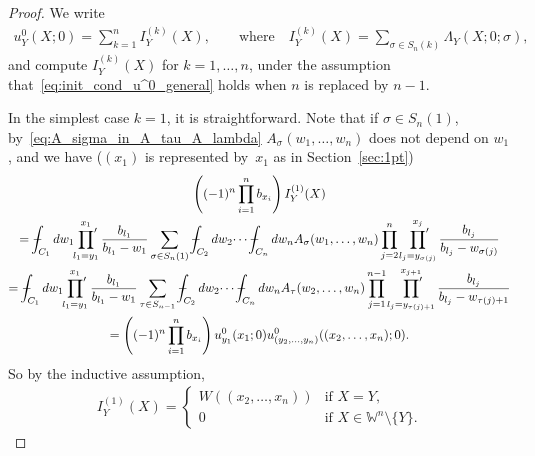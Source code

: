 \documentclass[11pt]{article}
\numberwithin{equation}{section}
\def\Xint#1{\mathchoice
{\XXint\displaystyle\textstyle{#1}}%
{\XXint\textstyle\scriptstyle{#1}}%
{\XXint\scriptstyle\scriptscriptstyle{#1}}%
{\XXint\scriptscriptstyle\scriptscriptstyle{#1}}%
\!\int}
\def\XXint#1#2#3{{\setbox0=\hbox{$#1{#2#3}{\int}$}
\vcenter{\hbox{$#2#3$}}\kern-.5\wd0}}
\def\dashint{\Xint-}
\newcommand{\prodprime}{\sideset{}{'}\prod}
\newcommand{\Weylchamber}{\mathbb{W}}
\begin{document}
\begin{proof}
 We write
 \begin{gather*}
 u^0_Y(X; 0) = \sum^n_{k = 1} I^{(k)}_Y(X), \qquad \text{where} \quad I^{(k)}_Y(X) = \sum_{\sigma \in S_n(k)} \Lambda_Y(X; 0; \sigma),
 \end{gather*}
 and compute $I^{(k)}_Y(X)$ for $k = 1, \dotsc, n$, under the assumption that~\eqref{eq:init_cond_u^0_general} holds when $n$ is replaced by $n - 1$.

 In the simplest case $k = 1$, it is straightforward. Note that if $\sigma \in S_n(1)$, by~\eqref{eq:A_sigma_in_A_tau_A_lambda} $A_{\sigma}(w_1, \dotsc, w_n)$ does not depend on $w_1$, and we have ($(x_1)$ is represented by~$x_1$ as in Section~\ref{sec:1pt})
 \begin{gather*}
  \left( (-1)^n \prod^n_{i = 1} b_{x_i} \right) I^{(1)}_Y(X) \\
 =   \dashint_{C_1} dw_1 \prodprime^{x_1}_{l_1 = y_1} \frac{b_{l_1}}{b_{l_1} - w_1} \sum_{\sigma \in S_n(1)} \dashint_{C_2} dw_2 \dotsi \dashint_{C_n} dw_n A_{\sigma}(w_1, \dotsc, w_n) \prod^n_{j = 2} \prodprime^{x_j}_{l_j = y_{\sigma(j)}} \frac{b_{l_j}}{b_{l_j} - w_{\sigma(j)}} \\
 =   \dashint_{C_1} dw_1 \prodprime^{x_1}_{l_1 = y_1} \frac{b_{l_1}}{b_{l_1} - w_1} \sum_{\tau \in S_{n - 1}} \dashint_{C_2} dw_2 \dotsi \dashint_{C_n} dw_n A_{\tau}(w_2, \dotsc, w_n) \prod^{n - 1}_{j = 1} \prodprime^{x_{j + 1}}_{l_j = y_{\tau(j) + 1}} \frac{b_{l_j}}{b_{l_j} - w_{\tau(j) + 1}} \\
 =  \left( (-1)^n \prod^n_{i = 1} b_{x_i} \right) u^0_{y_1}(x_1; 0) u^0_{(y_2, \dotsc, y_n)}((x_2, \dotsc, x_n); 0).
 \end{gather*}
 So by the inductive assumption,
 \begin{gather*}
 I^{(1)}_Y(X) =
 \begin{cases}
 W((x_2, \dotsc, x_n)) & \text{if $X = Y$}, \\
 0 & \text{if $X \in \Weylchamber^n {\setminus} \{ Y \}$}.
 \end{cases}
 \end{gather*}


\end{proof}
\end{document}
